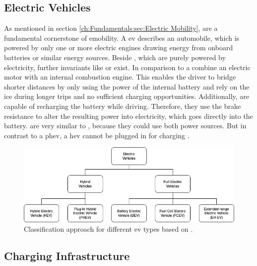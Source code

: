 \subsection{Electric Vehicles}
\label{ch:Fundamentals:sec:Electric Mobility:Electric Vehicles}

As mentioned in section \ref{ch:Fundamentals:sec:Electric Mobility},  are a fundamental cornerstone of \Gls{emobility}. A \acrshort{ev} describes an automobile, which is powered by only one or more electric engines drawing energy from onboard batteries or similar energy sources. 
Beside , which are purely powered by electricity, further invariants like  or  exist. In comparison to  a  combine an electric motor with an internal combustion engine.
This enables the driver to bridge shorter distances by only using the power of the internal battery and rely on the \acrshort{ice} during longer trips and no sufficient charging opportunities. Additionally,  are capable of recharging the battery while driving.
Therefore, they use the brake resistance to alter the resulting power into electricity, which goes directly into the battery.
 are very similar to , because they could use both power sources. But in contrast to a \acrshort{phev}, a \acrshort{hev} cannot be plugged in for charging \cite{kathiresh_e-mobility_2022}.

\begin{figure}[h]
    \centering
    \includegraphics[scale=0.4]{resources/images/main/1_fundamentals/ElectricVehicleTypes.png}
    \caption{Classification approach for different \acrshort{ev} types based on \cite{acharige_review_2023}.}
    \label{fig:ev-classification}
\end{figure}

\subsection{Charging Infrastructure}
\label{ch:Fundamentals:sec:Electric Mobility:ssec:Charging Infrastructure}

